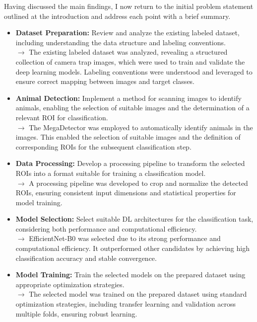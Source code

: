 Having discussed the main findings, I now return to the initial problem statement outlined at the introduction and address each point with a brief summary.
\begin{itemize}
    \item \textbf{Dataset Preparation:} Review and analyze the existing labeled dataset, including understanding the data structure and labeling conventions.\\
    $\rightarrow$ The existing labeled dataset was analyzed, revealing a structured collection of camera trap images, which were used to train and validate the deep learning models. Labeling conventions were understood and leveraged to ensure correct mapping between images and target classes.

    \item \textbf{Animal Detection:} Implement a method for scanning images to identify animals, enabling the selection of suitable images and the determination of a relevant \ac{ROI} for classification.\\
    $\rightarrow$ The MegaDetector was employed to automatically identify animals in the images. This enabled the selection of suitable images and the definition of corresponding \acsp{ROI} for the subsequent classification step.

    \item \textbf{Data Processing:} Develop a processing pipeline to transform the selected \acp{ROI} into a format suitable for training a classification model.\\
    $\rightarrow$ A processing pipeline was developed to crop and normalize the detected \acsp{ROI}, ensuring consistent input dimensions and statistical properties for model training.

    \item \textbf{Model Selection:} Select suitable \ac{DL} architectures for the classification task, considering both performance and computational efficiency.\\
    $\rightarrow$ EfficientNet-B0 was selected due to its strong performance and computational efficiency. It outperformed other candidates by achieving high classification accuracy and stable convergence.

    \item \textbf{Model Training:} Train the selected models on the prepared dataset using appropriate optimization strategies.\\
    $\rightarrow$ The selected model was trained on the prepared dataset using standard optimization strategies, including transfer learning and validation across multiple folds, ensuring robust learning.


\end{itemize}
